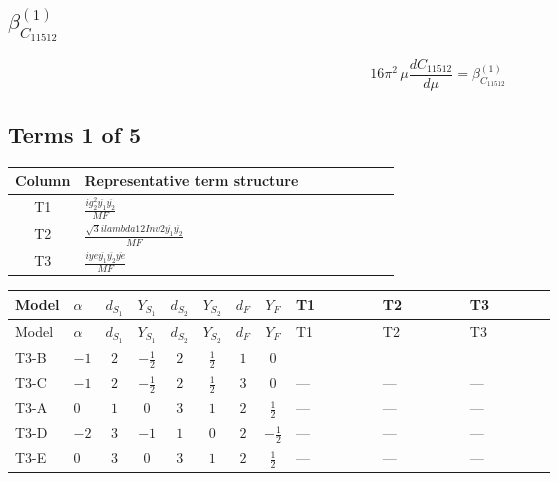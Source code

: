 \documentclass[8pt]{article}
\begin{document}
\begin{landscape}
\section*{$\beta_{C_{11512}}^{(1)}$}
\[16\pi^2\,\mu\frac{d C_{11512}}{d\mu}=\beta_{C_{11512}}^{(1)}\]
\subsection*{Terms 1 of 5}
\begin{center}
\begin{tabular}{@{}c >{\raggedright\arraybackslash}p{0.82\linewidth}@{}}
\toprule
Column & Representative term structure \\
\midrule
T1 & \(\displaystyle \frac{i g_{2}^{2} \overline{y_{1}} \overline{y_{2}}}{MF}\) \\
\midrule
T2 & \(\displaystyle \frac{\sqrt{3} i lambda12Inv2 \overline{y_{1}} \overline{y_{2}}}{MF}\) \\
\midrule
T3 & \(\displaystyle \frac{i ye \overline{y_{1}} \overline{y_{2}} \overline{ye}}{MF}\) \\
\midrule
\bottomrule
\end{tabular}
\end{center}
\smallskip
\tiny
\begin{longtable}{@{}llcccccc >{\raggedright\arraybackslash}p{0.21\linewidth} >{\raggedright\arraybackslash}p{0.21\linewidth} >{\raggedright\arraybackslash}p{0.21\linewidth}@{}}
\toprule
Model & $\alpha$ & $d_{S_1}$ & $Y_{S_1}$ & $d_{S_2}$ & $Y_{S_2}$ & $d_F$ & $Y_F$ & T1 & T2 & T3 \\
\midrule
\endfirsthead
\toprule
Model & $\alpha$ & $d_{S_1}$ & $Y_{S_1}$ & $d_{S_2}$ & $Y_{S_2}$ & $d_F$ & $Y_F$ & T1 & T2 & T3 \\
\midrule
\endhead
T3-B & $-1$ & $2$ & $-\frac{1}{2}$ & $2$ & $\frac{1}{2}$ & $1$ & $0$ & \scriptsize\adjustbox{max width=\linewidth}{$\begin{gathered} - \frac{3 i g_{2}^{2} \overline{y_{1}} \overline{y_{2}}}{4 MF}\end{gathered}$} & \scriptsize\adjustbox{max width=\linewidth}{$\begin{gathered} - \frac{\sqrt{3} i lambda12Inv2 \overline{y_{1}} \overline{y_{2}}}{3 MF}\end{gathered}$} & \scriptsize\adjustbox{max width=\linewidth}{$\begin{gathered} \frac{i ye \overline{y_{1}} \overline{y_{2}} \overline{ye}}{4 MF}\end{gathered}$} \\
\midrule
T3-C & $-1$ & $2$ & $-\frac{1}{2}$ & $2$ & $\frac{1}{2}$ & $3$ & $0$ & --- & --- & --- \\
\midrule
T3-A & $0$ & $1$ & $0$ & $3$ & $1$ & $2$ & $\frac{1}{2}$ & --- & --- & --- \\
\midrule
T3-D & $-2$ & $3$ & $-1$ & $1$ & $0$ & $2$ & $-\frac{1}{2}$ & --- & --- & --- \\
\midrule
T3-E & $0$ & $3$ & $0$ & $3$ & $1$ & $2$ & $\frac{1}{2}$ & --- & --- & --- \\
\midrule
\bottomrule
\end{longtable}
\clearpage

\end{landscape}
\end{document}
